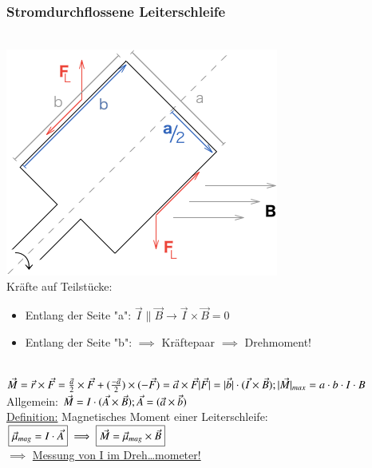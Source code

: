         \subsubsection{Stromdurchflossene Leiterschleife}\leavevmode \\
        
        \includegraphics{skizzen/16/16_1B09}\\
        
        Kräfte auf Teilstücke:\\
        \begin{itemize}
        	\item Entlang der Seite "a": $\vec{I}\parallel\vec{B}\rightarrow \vec{I}\times\vec{B}=0 $\\
        	\item Entlang der Seite "b": $\implies$ Kräftepaar $\implies$ Drehmoment!
        \end{itemize}\\
        
        $\vec{M}=\vec{r}\times\vec{F}=\frac{\vec{a}}{2}\times\vec{F}+(\frac{-\vec{a}}{2})\times(-\vec{F})=\vec{a}\times\vec{F}\\
        \vert\vec{F}\vert=\vert\vec{b}\vert\cdot(\vec{I}\times\vec{B});\hfil \vert\vec{M}\vert_{max}=a\cdot b\cdot I\cdot B$\\
        
        Allgemein: $\vec{M}=I\cdot(\vec{A}\times\vec{B});\hfil \vec{A}=(\vec{a}\times\vec{b})$\\
        
        \underline{Definition:} Magnetisches Moment einer Leiterschleife:\\
        $\boxed{\vec{\mu}_{mag}=I\cdot\vec{A}}\\
        \implies\boxed{\vec{M}=\vec{\mu}_{mag}\times\vec{B}}$\\
        
        $\implies$ \underline{Messung von I im Dreh…mometer!}
        
        
        
        
        
        
        
        
        
        
        
        
        
        
        
\newpage  